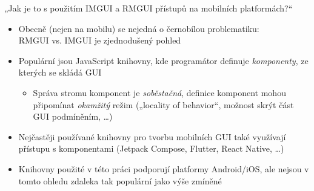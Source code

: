 \documentclass[FM,widescreen]{tulpresentation} %
\begin{document}
	\begin{frame}
		\medskip
		„Jak je to s použitím IMGUI a RMGUI přístupů na mobilních platformách?“
		
		\bigskip
		\begin{itemize}
			\item Obecně (nejen na mobilu) se nejedná o černobílou problematiku:\\ RMGUI vs. IMGUI je zjednodušený pohled
			\item Populární jsou JavaScript knihovny, kde programátor definuje \textit{komponenty}, ze kterých se skládá GUI
			\begin{itemize}				
				\item Správa stromu komponent je \textit{soběstačná}, definice komponent mohou připomínat \textit{okamžitý} režim („locality of behavior“, možnost skrýt část GUI podmíněním, \dots)
			\end{itemize}
			\item Nejčastěji používané knihovny pro tvorbu mobilních GUI také využívají přístupu s komponentami (Jetpack Compose, Flutter, React Native, \dots)
			\item Knihovny použité v této práci podporují platformy Android/iOS, ale nejsou v tomto ohledu zdaleka tak populární jako výše zmíněné
		\end{itemize}
	\end{frame}
\end{document}
